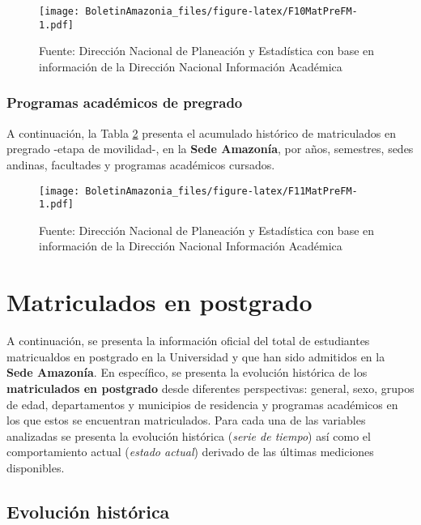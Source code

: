 \documentclass[
]{book}
\begin{document}
\begin{figure}
\centering
\texttt{[image: BoletinAmazonia\_files/figure-latex/F10MatPreFM-1.pdf]}
\caption{\label{fig:F10MatPreFM}Fuente: Dirección Nacional de Planeación y Estadística con base en información de la Dirección Nacional Información Académica}
\end{figure}

\hypertarget{programas-acaduxe9micos-de-pregrado-4}{%
\subsubsection{Programas académicos de pregrado}\label{programas-acaduxe9micos-de-pregrado-4}}

A continuación, la Tabla \ref{fig:F11MatPreFM} presenta el acumulado histórico de matriculados en pregrado -etapa de movilidad-, en la \textbf{Sede Amazonía}, por años, semestres, sedes andinas, facultades y programas académicos cursados.

\begin{figure}
\centering
\texttt{[image: BoletinAmazonia\_files/figure-latex/F11MatPreFM-1.pdf]}
\caption{\label{fig:F11MatPreFM}Fuente: Dirección Nacional de Planeación y Estadística con base en información de la Dirección Nacional Información Académica}
\end{figure}

\hypertarget{MatPos}{%
\section{Matriculados en postgrado}\label{MatPos}}

A continuación, se presenta la información oficial del total de estudiantes matricualdos en postgrado en la Universidad y que han sido admitidos en la \textbf{Sede Amazonía}. En específico, se presenta la evolución histórica de los \textbf{matriculados en postgrado} desde diferentes perspectivas: general, sexo, grupos de edad, departamentos y municipios de residencia y programas académicos en los que estos se encuentran matriculados. Para cada una de las variables analizadas se presenta la evolución histórica (\emph{serie de tiempo}) así como el comportamiento actual (\emph{estado actual}) derivado de las últimas mediciones disponibles.

\hypertarget{evoluciuxf3n-histuxf3rica-7}{%
\subsection{Evolución histórica}\label{evoluciuxf3n-histuxf3rica-7}}
\end{document}
